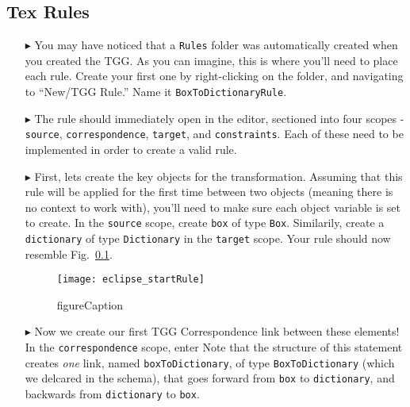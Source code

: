 \newpage
\hypertarget{rules tex}{}
\subsection{Tex Rules}
\texHeader


\begin{itemize}

\item[$\blacktriangleright$] You may have noticed that a \texttt{Rules} folder was automatically created when you created the TGG. As you can imagine, this is
where you'll need to place each rule. Create your first one by right-clicking on the folder, and navigating to ``New/TGG Rule.'' Name it
\texttt{BoxToDictionaryRule}.

\item[$\blacktriangleright$] The rule should immediately open in the editor, sectioned into four scopes - \texttt{source}, \texttt{correspondence},
\texttt{target}, and \texttt{constraints}. Each of these need to be implemented in order to create a valid rule.

\item[$\blacktriangleright$] First, lets create the key objects for the transformation. Assuming that this rule will be applied for the first time between two
objects (meaning there is no context to work with), you'll need to make sure each object variable is set to create. In the \texttt{source} scope, create
\texttt{box} of type \texttt{Box}. Similarily, create a \texttt{dictionary} of type \texttt{Dictionary} in the \texttt{target} scope. Your rule should now
resemble Fig.~\ref{}.

\begin{figure}[htbp]
\begin{center}
  \texttt{[image: eclipse\_startRule]}
  \caption{figureCaption}
  \label{fig:textSourceRule}
\end{center}
\end{figure}

\item[$\blacktriangleright$] Now we create our first TGG Correspondence link between these elements! In the \texttt{correspondence} scope, enter 
Note that the structure of this statement creates \emph{one} link, named \texttt{boxToDictionary}, of type \texttt{BoxToDictionary} (which we delcared in the
schema), that goes forward from \texttt{box} to \texttt{dictionary}, and backwards from \texttt{dictionary} to \texttt{box}.


\end{itemize}
